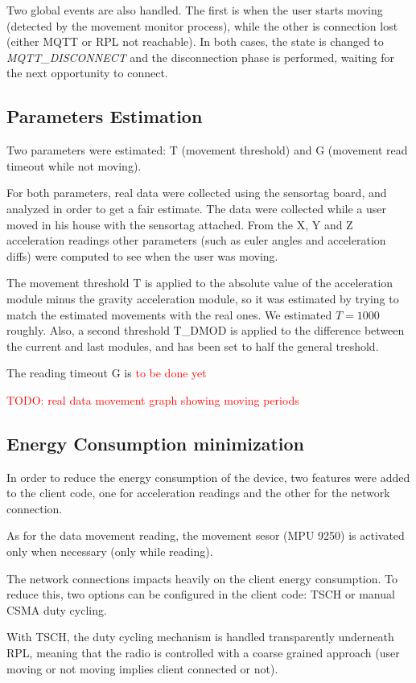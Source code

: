 \documentclass[a4paper, 11pt]{article}
\begin{document}
Two global events are also handled. The first is when the user starts moving (detected by the movement monitor process), while the other is connection lost (either MQTT or RPL not reachable). In both cases, the state is changed to \emph{MQTT\_DISCONNECT} and the disconnection phase is performed, waiting for the next opportunity to connect.

\subsection*{Parameters Estimation}
Two parameters were estimated: T (movement threshold) and G (movement read timeout while not moving).

For both parameters, real data were collected using the sensortag board, and analyzed in order to get a fair estimate.
The data were collected while a user moved in his house with the sensortag attached. From the X, Y and Z acceleration readings other parameters (such as euler angles and acceleration diffs) were computed to see when the user was moving.

The movement threshold T is applied to the absolute value of the acceleration module minus the gravity acceleration module, so it was estimated by trying to match the estimated movements with the real ones. We estimated $T = 1000$ roughly. Also, a second threshold T\_DMOD is applied to the difference between the current and last modules, and has been set to half the general treshold. 

The reading timeout G is \textcolor{red}{to be done yet}

\textcolor{red}{TODO: real data movement graph showing moving periods}

\subsection*{Energy Consumption minimization}
In order to reduce the energy consumption of the device, two features were added to the client code, one for acceleration readings and the other for the network connection.

As for the data movement reading, the movement sesor (MPU 9250) is activated only when necessary (only while reading). 

The network connections impacts heavily on the client energy consumption. To reduce this, two options can be configured in the client code: TSCH or manual CSMA duty cycling.

With TSCH, the duty cycling mechanism is handled transparently underneath RPL, meaning that the radio is controlled with a coarse grained approach (user moving or not moving implies client connected or not).
\end{document}
